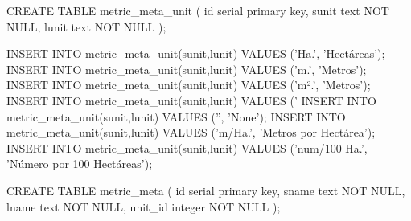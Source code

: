 \lstset{caption=Listado de métricas de paisaje y unidad disponibles en la extensión.,label= metric}
\begin{SQL}
CREATE TABLE metric_meta_unit (
	id serial primary key,
	sunit text NOT NULL,
	lunit text NOT NULL
);
                                                    
INSERT INTO metric_meta_unit(sunit,lunit) VALUES ('Ha.', 'Hectáreas');
INSERT INTO metric_meta_unit(sunit,lunit) VALUES ('m.', 'Metros');
INSERT INTO metric_meta_unit(sunit,lunit) VALUES ('m².', 'Metros');
INSERT INTO metric_meta_unit(sunit,lunit) VALUES ('%
INSERT INTO metric_meta_unit(sunit,lunit) VALUES ('', 'None');
INSERT INTO metric_meta_unit(sunit,lunit) VALUES ('m/Ha.', 'Metros por Hectárea');
INSERT INTO metric_meta_unit(sunit,lunit) VALUES ('num/100 Ha.', 'Número por 100 Hectáreas');


CREATE TABLE metric_meta (
	id serial primary key,
	sname text NOT NULL,
	lname text NOT NULL,
	unit_id integer NOT NULL
);


\end{SQL}

